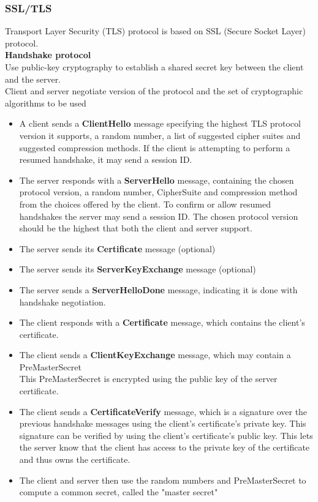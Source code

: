 \documentclass[10pt,a4paper]{book}
\begin{document}
\subsubsection{SSL/TLS}
Transport Layer Security (TLS) protocol is based on SSL (Secure Socket Layer) protocol.\\
\textbf{Handshake protocol}\\
Use public-key cryptography to establish a shared secret key between the client and the server.\\
Client and server negotiate version of the protocol and the set of cryptographic algorithms to be used
\begin{itemize}
\item A client sends a \textbf{ClientHello} message specifying the highest TLS protocol version it supports, a random number, a list of suggested cipher suites and suggested compression methods. If the client is attempting to perform a resumed handshake, it may send a session ID.
\item The server responds with a \textbf{ServerHello} message, containing the chosen protocol version, a random number, CipherSuite and compression method from the choices offered by the client. To confirm or allow resumed handshakes the server may send a session ID. The chosen protocol version should be the highest that both the client and server support.
\item The server sends its \textbf{Certificate} message (optional)
\item The server sends its \textbf{ServerKeyExchange} message (optional)
\item The server sends a \textbf{ServerHelloDone} message, indicating it is done with handshake negotiation.
\item The client responds with a \textbf{Certificate} message, which contains the client's certificate.
\item The client sends a \textbf{ClientKeyExchange} message, which may contain a PreMasterSecret\\
This PreMasterSecret is encrypted using the public key of the server certificate.
\item The client sends a \textbf{CertificateVerify} message, which is a signature over the previous handshake messages using the client's certificate's private key. This signature can be verified by using the client's certificate's public key. This lets the server know that the client has access to the private key of the certificate and thus owns the certificate.
\item  The client and server then use the random numbers and PreMasterSecret to compute a common secret, called the "master secret"
\end{itemize}
\end{document}
